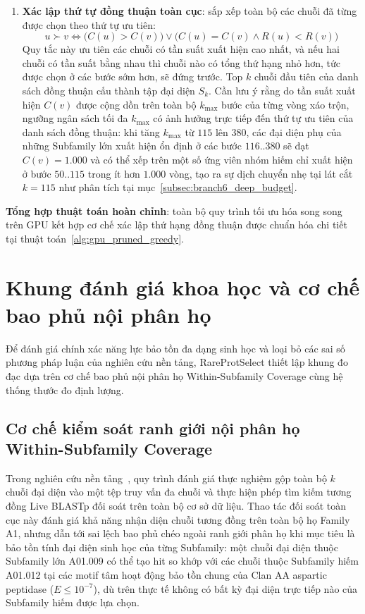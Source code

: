 \begin{enumerate}
    \item \textbf{Xác lập thứ tự đồng thuận toàn cục}: sắp xếp toàn bộ các chuỗi đã từng được chọn theo thứ tự ưu tiên:
    \begin{equation}
    \label{eq:consensus_ordering}
    u \succ v \iff \Big(C(u) > C(v)\Big) \lor \Big(C(u) = C(v) \land R(u) < R(v)\Big)
    \end{equation}
    Quy tắc này ưu tiên các chuỗi có tần suất xuất hiện cao nhất, và nếu hai chuỗi có tần suất bằng nhau thì chuỗi nào có tổng thứ hạng nhỏ hơn, tức được chọn ở các bước sớm hơn, sẽ đứng trước. Top $k$ chuỗi đầu tiên của danh sách đồng thuận cấu thành tập đại diện $S_k$. Cần lưu ý rằng do tần suất xuất hiện $C(v)$ được cộng dồn trên toàn bộ $k_{\max}$ bước của từng vòng xáo trộn, ngưỡng ngân sách tối đa $k_{\max}$ có ảnh hưởng trực tiếp đến thứ tự ưu tiên của danh sách đồng thuận: khi tăng $k_{\max}$ từ $115$ lên $380$, các đại diện phụ của những Subfamily lớn xuất hiện ổn định ở các bước $116..380$ sẽ đạt $C(v) = 1.000$ và có thể xếp trên một số ứng viên nhóm hiếm chỉ xuất hiện ở bước $50..115$ trong ít hơn $1.000$ vòng, tạo ra sự dịch chuyển nhẹ tại lát cắt $k = 115$ như phân tích tại mục~\ref{subsec:branch6_deep_budget}.
\end{enumerate}

\medskip
\noindent\textbf{Tổng hợp thuật toán hoàn chỉnh}: toàn bộ quy trình tối ưu hóa song song trên GPU kết hợp cơ chế xác lập thứ hạng đồng thuận được chuẩn hóa chi tiết tại thuật toán~\ref{alg:gpu_pruned_greedy}.


\FloatBarrier
\section{Khung đánh giá khoa học và cơ chế bao phủ nội phân họ}
\label{sec:methodology_evaluation}

Để đánh giá chính xác năng lực bảo tồn đa dạng sinh học và loại bỏ các sai số phương pháp luận của nghiên cứu nền tảng, RareProtSelect thiết lập khung đo đạc dựa trên cơ chế bao phủ nội phân họ Within-Subfamily Coverage cùng hệ thống thước đo định lượng.

\subsection{Cơ chế kiểm soát ranh giới nội phân họ Within-Subfamily Coverage}
\label{subsec:within_subfamily_mechanism}

Trong nghiên cứu nền tảng~\cite{nguyen2025}, quy trình đánh giá thực nghiệm gộp toàn bộ $k$ chuỗi đại diện vào một tệp truy vấn đa chuỗi và thực hiện phép tìm kiếm tương đồng Live BLASTp đối soát trên toàn bộ cơ sở dữ liệu. Thao tác đối soát toàn cục này đánh giá khả năng nhận diện chuỗi tương đồng trên toàn bộ họ Family A1, nhưng dẫn tới sai lệch bao phủ chéo ngoài ranh giới phân họ khi mục tiêu là bảo tồn tính đại diện sinh học của từng Subfamily: một chuỗi đại diện thuộc Subfamily lớn A01.009 có thể tạo hit so khớp với các chuỗi thuộc Subfamily hiếm A01.012 tại các motif tâm hoạt động bảo tồn chung của Clan AA aspartic peptidase ($E \le 10^{-7}$), dù trên thực tế không có bất kỳ đại diện trực tiếp nào của Subfamily hiếm được lựa chọn.

